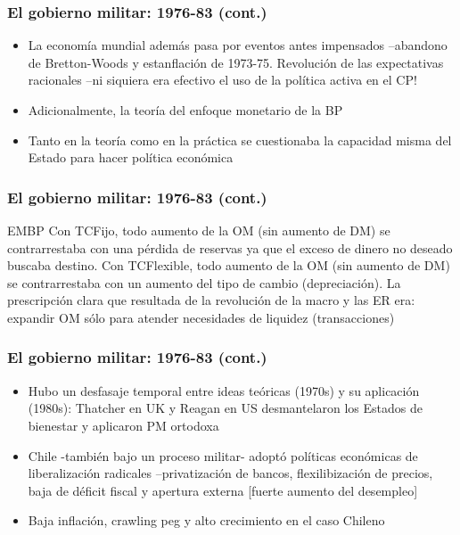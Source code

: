 \documentclass[14pt,aspectratio=169]{beamer}
\begin{document}
  \begin{frame}\frametitle{El gobierno militar: 1976-83 (cont.)}
                 \begin{itemize}\itemsep 5pt \medskip
                 \item La economía mundial además pasa por eventos
                   antes impensados --abandono de Bretton-Woods y
                   estanflación de 1973-75. Revolución de las
                   expectativas racionales --ni siquiera era efectivo
                   el uso de la política activa en el CP!
                   \item Adicionalmente, la teoría del enfoque
                     monetario de la BP
                   \item Tanto en la teoría como en la práctica se
                     cuestionaba la capacidad misma del Estado para
                     hacer política económica
                 \end{itemize}
               \end{frame}
               


 \begin{frame}\frametitle{El gobierno militar: 1976-83 (cont.)}
   \begin{block}{EMBP}
Con TCFijo, todo aumento de la OM (sin aumento de DM) se
contrarrestaba con una pérdida de reservas ya que el exceso de dinero
no deseado buscaba destino. Con TCFlexible, todo aumento de la OM (sin
aumento de DM) se contrarrestaba con un aumento del tipo de cambio
(depreciación). La prescripción clara que resultada de la revolución
de la macro y las ER era: expandir OM sólo para atender necesidades de
liquidez (transacciones)
     \end{block}
               \end{frame}



 \begin{frame}\frametitle{El gobierno militar: 1976-83 (cont.)}
                 \begin{itemize}\itemsep 5pt \medskip
                 \item Hubo un desfasaje temporal entre ideas teóricas
                   (1970s) y su aplicación (1980s): Thatcher en UK y
                   Reagan en US desmantelaron los Estados de bienestar
                   y aplicaron PM ortodoxa
                   \item Chile -también bajo un proceso militar-
                     adoptó políticas económicas de liberalización
                     radicales --privatización de bancos,
                     flexilibización de precios, baja de déficit
                     fiscal y apertura externa [fuerte aumento del desempleo]
                     \item Baja inflación, crawling peg y alto
                       crecimiento en el caso Chileno 
                 \end{itemize}
               \end{frame}
\end{document}
